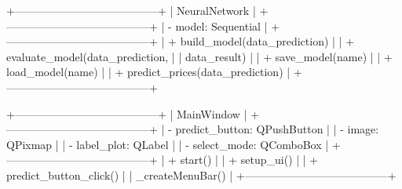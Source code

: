 +---------------------------------------+
|            NeuralNetwork              |
+---------------------------------------+
| - model: Sequential                   |
+---------------------------------------+
| + build{\_}model(data{\_}prediction)        |
| + evaluate{\_}model(data{\_}prediction,     |
|                  data{\_}result)         |
| + save{\_}model(name)                    |
| + load{\_}model(name)                    |
| + predict{\_}prices(data{\_}prediction)     |
+---------------------------------------+


+---------------------------------------+
|             MainWindow                |
+---------------------------------------+
| - predict{\_}button: QPushButton         |
| - image: QPixmap                      |
| - label{\_}plot: QLabel                  |
| - select{\_}mode: QComboBox              |
+---------------------------------------+
| + start()                             |
| + setup{\_}ui()                          |
| + predict{\_}button{\_}click()              |
| {\_}createMenuBar()                      |
+---------------------------------------+
